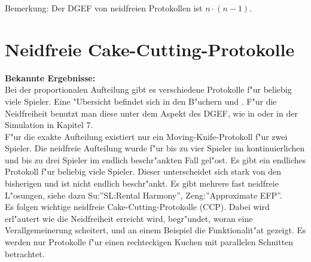 \documentclass[11pt, a4paper, twoside]{article}
\numberwithin{equation}{section}
\begin{document}
Bemerkung: Der DGEF von neidfreien Protokollen ist $n\cdot(n-1)$.\section{Neidfreie Cake-Cutting-Protokolle}
\textbf{Bekannte Ergebnisse:}\\Bei der proportionalen Aufteilung gibt es verschiedene Protokolle f"ur beliebig viele Spieler. Eine "Ubersicht befindet sich in den B"uchern \cite{13} und \cite{14}. F"ur die Neidfreiheit benutzt man diese unter dem Aspekt des DGEF, wie in \cite{2} oder in der Simulation in Kapitel 7.\\
F"ur die exakte Aufteilung existiert nur ein Moving-Knife-Protokoll f"ur zwei Spieler.
Die neidfreie Aufteilung wurde f"ur bis zu vier Spieler im kontinuierlichen und bis zu drei Spieler im endlich beschr"ankten Fall gel"ost. Es gibt ein endliches Protokoll f"ur beliebig viele Spieler. Dieser unterscheidet sich stark von den bisherigen und ist nicht endlich beschr"ankt. Es gibt mehrere fast neidfreie L"osungen, siehe dazu Su\cite{11}:''SL:Rental Harmony'', Zeng:\cite{12}''Approximate EFP''.
\\Es folgen wichtige neidfreie Cake-Cutting-Protokolle (CCP). Dabei wird erl"autert wie die Neidfreiheit erreicht wird, begr"undet, woran eine Verallgemeinerung scheitert, und an einem Beispiel die Funktionalit"at gezeigt. Es werden nur Protokolle f"ur einen rechteckigen Kuchen mit parallelen Schnitten betrachtet.
\end{document}
